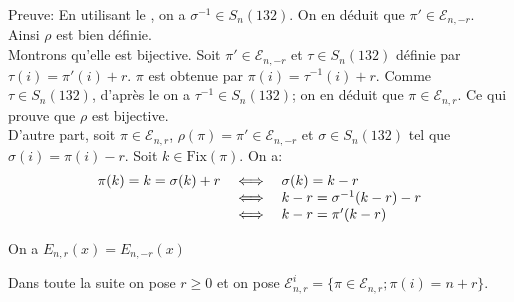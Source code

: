 Preuve: En utilisant le , on a $\sigma^{-1}\in S_{n}(132)$. On en déduit que $\pi'\in \mathcal{E}_{n,-r}$. \\Ainsi $\rho$ est bien définie.\vspace{5pt}\\
Montrons qu'elle est bijective. Soit $\pi' \in \mathcal{E}_{n, -r}$ et $\tau\in S_{n}(132)$ définie par $\tau(i) = \pi'(i)+r$. $\pi$ est obtenue par $\pi(i)=\tau^{-1}(i) + r$. Comme $\tau\in S_{n}(132)$, d'après le  on a $\tau^{-1}\in S_{n}(132)$; on en déduit que $\pi \in \mathcal{E}_{n, r}$. Ce qui prouve que $\rho$ est bijective.\vspace{10pt}\\
D'autre part, soit $\pi \in \mathcal{E}_{n,r}$, $\rho(\pi)=\pi' \in \mathcal{E}_{n, -r}$ et $\sigma \in S_{n}(132)$ tel que $\sigma(i)=\pi(i)-r$. Soit $k\in \text{Fix}(\pi)$. On a:
\[
	\begin{array}{l l l}
		\pi(k) = k = \sigma(k)+r & \iff & \sigma(k) = k-r            \\
		                         & \iff & k-r = \sigma^{-1}(k-r) - r \\
		                         & \iff & k-r = \pi'(k-r)
	\end{array}
\]


\begin{corollaire}
	On a $E_{n,r}(x) = E_{n,-r}(x)$
\end{corollaire}
Dans toute la suite on pose $r \geq 0$ et on pose $\mathcal{E}_{n, r}^{i} = \{\pi \in \mathcal{E}_{n, r}; \pi(i)=n+r\}$.\\


